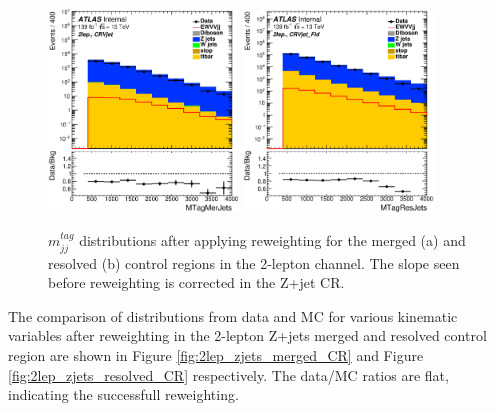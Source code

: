 \begin{figure}[ht]
    \centering
    \includegraphics[width=0.45\textwidth]{figures/2lep/reweighting/after_reweighting/C_0ptag1pfat0pjet_0ptv_CRVjet_MTagMerJets_Log.eps}
    \includegraphics[width=0.45\textwidth]{figures/2lep/reweighting/after_reweighting/C_0ptag2pjet_0ptv_CRVjet_Fid_MTagResJets_Log.eps}
    \caption{ $m^{tag}_{jj}$ distributions after applying reweighting for the merged (a) and resolved (b) control regions in the 2-lepton channel. The slope seen before reweighting is corrected in the Z+jet CR.}
    \label{fig:2lep_mtag_before_rw}
\end{figure}

The comparison of distributions from data and MC for various kinematic variables after reweighting in the 2-lepton Z+jets merged and resolved control region are shown in Figure \ref{fig:2lep_zjets_merged_CR} and Figure \ref{fig:2lep_zjets_resolved_CR}
respectively. The data/MC ratios are flat, indicating the successfull reweighting.

